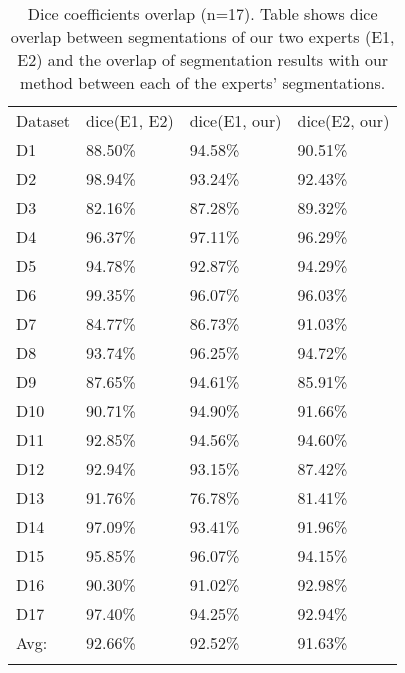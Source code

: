 \begin{table}[t]
  \centering
  \caption{Dice coefficients overlap (n=17). Table shows dice overlap between
    segmentations of our two experts (E1, E2) and the overlap of segmentation results with our method between
  each of the experts' segmentations.} 
  \label{tab:dices}
\begin{tabular}{llll} 
  \hline\noalign{\smallskip}
  Dataset & dice(E1, E2) & dice(E1, our) & dice(E2, our) \\
  \noalign{\smallskip}\hline\noalign{\smallskip}
  D1 & 88.50\% & 94.58\% & 90.51\% \\
  D2 & 98.94\% & 93.24\% & 92.43\% \\
  D3 & 82.16\% & 87.28\% & 89.32\% \\
  D4 & 96.37\% & 97.11\% & 96.29\% \\
  D5 & 94.78\% & 92.87\% & 94.29\% \\
  D6 & 99.35\% & 96.07\% & 96.03\% \\
  D7 & 84.77\% & 86.73\% & 91.03\% \\
  D8 & 93.74\% & 96.25\% & 94.72\% \\
  D9 & 87.65\% & 94.61\% & 85.91\% \\
  D10 & 90.71\% & 94.90\% & 91.66\% \\
  D11 & 92.85\% & 94.56\% & 94.60\% \\
  D12 & 92.94\% & 93.15\% & 87.42\% \\
  D13 & 91.76\% & 76.78\% & 81.41\% \\
  D14 & 97.09\% & 93.41\% & 91.96\% \\
  D15 & 95.85\% & 96.07\% & 94.15\% \\
  D16 & 90.30\% & 91.02\% & 92.98\% \\
  D17 & 97.40\% & 94.25\% & 92.94\% \\
  Avg: & 92.66\% & 92.52\% & 91.63\% \\
  \noalign{\smallskip}\hline
\end{tabular}
\end{table}
